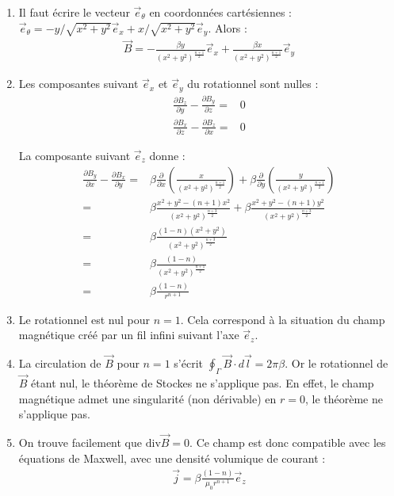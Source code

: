 \begin{correction}

\begin{enumerate}

	\item Il faut écrire le vecteur $\vec{e}_\theta$ en coordonnées cartésiennes : $\vec{e}_\theta=-y/\sqrt{x^2+y^2}\vec{e}_x+x/\sqrt{x^2+y^2}\vec{e}_y$. Alors :
	\begin{align*}
		\vec{B} = -\frac{\beta y}{\left(x^2+y^2\right)^{\frac{n+1}{2}}}\vec{e}_x+\frac{\beta x}{\left(x^2+y^2\right)^{\frac{n+1}{2}}}\vec{e}_y
	\end{align*}

	\item Les composantes suivant $\vec{e}_x$ et $\vec{e}_y$ du rotationnel sont nulles :
	\begin{align*}
		\frac{\partial B_z}{\partial y}-\frac{\partial B_y}{\partial z}=&0 \\
		\frac{\partial B_x}{\partial z}-\frac{\partial B_z}{\partial x}=&0
	\end{align*}
	
	La composante suivant $\vec{e}_z$ donne :
	\begin{align*}
		\frac{\partial B_y}{\partial x}-\frac{\partial B_x}{\partial y}=&\beta\frac{\partial }{\partial x}\left( \frac{x}{{\left(x^2+y^2 \right)^\frac{n+1}{2}}}\right) +\beta\frac{\partial }{\partial y}\left( \frac{y}{{\left(x^2+y^2 \right)^\frac{n+1}{2}}}\right) \\
		=& \beta\frac{x^2+y^2-(n+1)x^2}{{\left(x^2+y^2 \right)^\frac{n+3}{2}}}+\beta\frac{x^2+y^2-(n+1)y^2}{{\left(x^2+y^2\right)^\frac{n+3}{2}}} \\
		=& \beta\frac{(1-n)(x^2+y^2)}{{\left(x^2+y^2 \right)^\frac{n+3}{2}}} \\
		=& \beta\frac{(1-n)}{{\left(x^2+y^2 \right)^\frac{n+1}{2}}} \\
		=& \beta\frac{(1-n)}{{r^{n+1}}}
	\end{align*}
	
	\item Le rotationnel est nul pour $n=1$. Cela correspond à la situation du champ magnétique créé par un fil infini suivant l'axe $\vec{e}_z$.
	
	\item La circulation de $\vec{B}$ pour $n=1$ s'écrit $\oint_\Gamma\vec{B}\cdot d\vec{l}=2\pi \beta$. Or le rotationnel de $\vec{B}$ étant nul, le théorème de Stockes ne s'applique pas. En effet, le champ magnétique admet une singularité (non dérivable) en $r=0$, le théorème ne s'applique pas.
	
	\item On trouve facilement que $\mathrm{div}\vec{B}=0$. Ce champ est donc compatible avec les équations de Maxwell, avec une densité volumique de courant :
	\begin{align*}
		\vec{j}=\beta\frac{(1-n)}{{\mu_0r^{n+1}}}\vec{e}_z
	\end{align*}

\end{enumerate}

\end{correction}

